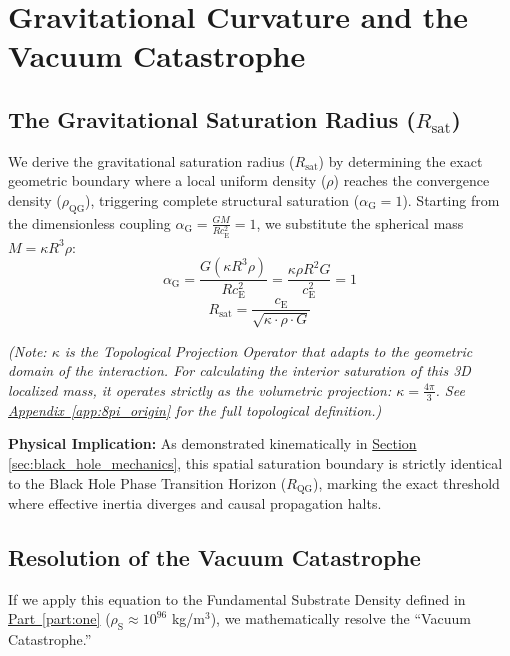 \section{Gravitational Curvature and the Vacuum Catastrophe}

\subsection{The Gravitational Saturation Radius ($R_{\mathrm{sat}}$)}
We derive the gravitational saturation radius ($R_{\mathrm{sat}}$) by determining the exact geometric boundary where a local uniform density ($\rho$) reaches the convergence density ($\rho_{\mathrm{QG}}$), triggering complete structural saturation ($\alpha_{\mathrm{G}} = 1$). Starting from the dimensionless coupling $\alpha_{\mathrm{G}} = \frac{GM}{R c_{\mathrm{E}}^2} = 1$, we substitute the spherical mass $M = \kappa R^3 \rho$:
\begin{equation}
    \alpha_{\mathrm{G}} = \frac{G(\kappa R^3 \rho)}{R c_{\mathrm{E}}^2} = \frac{\kappa \rho R^2 G}{c_{\mathrm{E}}^2} = 1
\end{equation}
\begin{equation}
    R_{\mathrm{sat}} = \frac{c_{\mathrm{E}}}{\sqrt{\kappa \cdot \rho \cdot G}}
\end{equation}

\textit{(Note: $\kappa$ is the Topological Projection Operator that adapts to the geometric domain of the interaction. For calculating the interior saturation of this 3D localized mass, it operates strictly as the volumetric projection: $\kappa = \frac{4\pi}{3}$. See \hyperref[app:8pi_origin]{Appendix~\ref*{app:8pi_origin}} for the full topological definition.)}

\vspace{0.5em}
\noindent \textbf{Physical Implication:} As demonstrated kinematically in \hyperref[sec:black_hole_mechanics]{Section \ref*{sec:black_hole_mechanics}}, this spatial saturation boundary is strictly identical to the Black Hole Phase Transition Horizon ($R_{\mathrm{QG}}$), marking the exact threshold where effective inertia diverges and causal propagation halts.

\subsection{Resolution of the Vacuum Catastrophe}
If we apply this equation to the Fundamental Substrate Density defined in \hyperref[part:one]{Part~\ref{part:one}} ($\rho_{\mathrm{S}} \approx 10^{96}$ kg/m$^3$), we mathematically resolve the ``Vacuum Catastrophe.'' 

